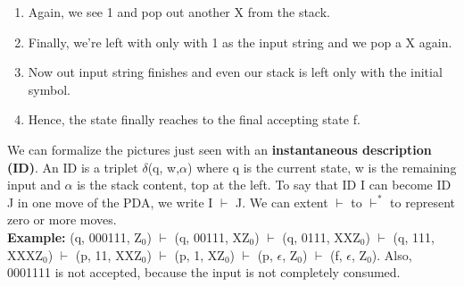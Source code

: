 \documentclass{report}
\begin{document}
\begin{enumerate}
\item Again, we see 1 and pop out another X from the stack. 
\begin{center}
\end{center}
\newpage
\item Finally, we're left with only with 1 as the input string and we pop a X again. 
\begin{center}
\end{center}

\item Now out input string finishes and even our stack is left only with the initial symbol. 
\begin{center}
\end{center}

\item Hence, the state finally reaches to the final accepting state f.
\begin{center}
\end{center}
\end{enumerate}
We can formalize the pictures just seen with an \textbf{instantaneous description (ID)}. An ID is a triplet $\delta$(q, w,$\alpha$) where q is the current state, w is the remaining input and $\alpha$ is the stack content, top at the left. To say that ID I can become ID J in one move of the PDA, we write I $\vdash$ J. We can extent $\vdash$ to $\vdash^*$ to represent zero or more moves. \\
\textbf{Example:} (q, 000111, Z$_0$) $\vdash$ (q, 00111, XZ$_0$) $\vdash$ (q, 0111, XXZ$_0$) $\vdash$ (q, 111, XXXZ$_0$) $\vdash$ (p, 11, XXZ$_0$) $\vdash$ (p, 1, XZ$_0$) $\vdash$ (p, $\epsilon$, Z$_0$) $\vdash$ (f, $\epsilon$, Z$_0$). Also, 0001111 is not accepted, because the input is not completely consumed.
\end{document}

